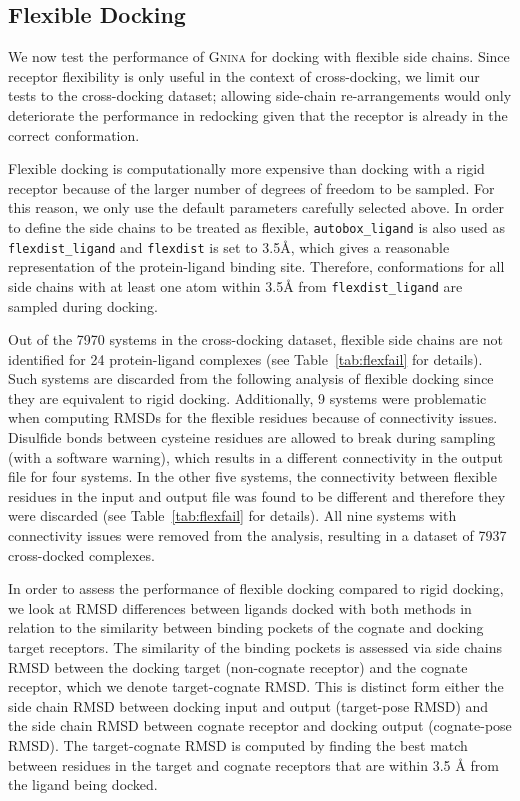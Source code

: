 \documentclass[journal=jcisd8,manuscript=article]{achemso}
\begin{document}
\subsection{Flexible Docking}

We now test the performance of \textsc{Gnina} for docking with flexible side chains. Since receptor flexibility is only useful in the context of cross-docking, we limit our tests to the cross-docking dataset; allowing side-chain re-arrangements would only deteriorate the performance in redocking given that the receptor is already in the correct conformation.

Flexible docking is computationally more expensive than docking with a rigid receptor because of the larger number of degrees of freedom to be sampled. For this reason, we only use the default parameters carefully selected above. In order to define the side chains to be treated as flexible, \texttt{autobox\_ligand} is also used as \texttt{flexdist\_ligand} and \texttt{flexdist} is set to 3.5{\AA}, which gives a reasonable representation of the protein-ligand binding site\cite{meli2020leraning}. Therefore, conformations for all side chains with at least one atom within 3.5{\AA} from \texttt{flexdist\_ligand} are sampled during docking.

Out of the 7970 systems in the cross-docking dataset, flexible side chains are not identified for 24 protein-ligand complexes (see Table~\ref{tab:flexfail} for details). Such systems are discarded from the following analysis of flexible docking since they are equivalent to rigid docking. Additionally, 9 systems were problematic when computing RMSDs for the flexible residues because of connectivity issues. Disulfide bonds between cysteine residues are allowed to break during sampling (with a software warning), which results in a different connectivity in the output file for four systems. In the other five systems, the connectivity between flexible residues in the input and output file was found to be different and therefore they were discarded (see Table~\ref{tab:flexfail} for details). All nine systems with connectivity issues were removed from the analysis, resulting in a dataset of 7937 cross-docked complexes.

In order to assess the performance of flexible docking compared to rigid docking, we look at RMSD differences between ligands docked with both methods in relation to the similarity between binding pockets of the cognate and docking target receptors. The similarity of the binding pockets is assessed via side chains RMSD between the docking target (non-cognate receptor) and the cognate receptor, which we denote target-cognate RMSD. This is distinct form either the side chain RMSD between docking input and output (target-pose RMSD) and the side chain RMSD between cognate receptor and docking output (cognate-pose RMSD). The target-cognate RMSD is computed by finding the best match between residues in the target and cognate receptors that are within 3.5 {\AA} from the ligand being docked.
\end{document}
